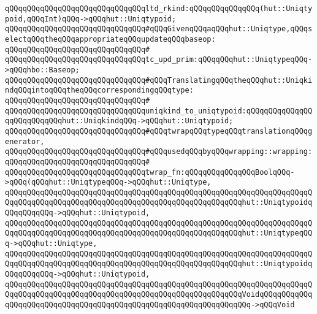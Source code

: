 \verb|qQQqqQQqqQQqqQQqqQQqqQQqqQQqqQQqltd_rkind:qQQqqQQqqQQqqQQq(hut::Uniqtypoid,qQQqInt)qQQq->qQQqhut::Uniqtypoid;|\newline
\newline
\verb|qQQqqQQqqQQqqQQqqQQqqQQqqQQqqQQq#qQQqGivenqQQqaqQQqhut::Uniqtype,qQQqselectqQQqtheqQQqappropriateqQQqupdateqQQqbaseop:|\newline
\verb|qQQqqQQqqQQqqQQqqQQqqQQqqQQqqQQq#|\newline
\verb|qQQqqQQqqQQqqQQqqQQqqQQqqQQqqQQqtc_upd_prim:qQQqqQQqhut::UniqtypeqQQq->qQQqhbo::Baseop;|\newline
\newline
\verb|qQQqqQQqqQQqqQQqqQQqqQQqqQQqqQQq#qQQqTranslatingqQQqtheqQQqhut::UniqkindqQQqintoqQQqtheqQQqcorrespondingqQQqtype:|\newline
\verb|qQQqqQQqqQQqqQQqqQQqqQQqqQQqqQQq#|\newline
\verb|qQQqqQQqqQQqqQQqqQQqqQQqqQQqqQQquniqkind_to_uniqtypoid:qQQqqQQqqQQqqQQqqQQqqQQqqQQqhut::UniqkindqQQq->qQQqhut::Uniqtypoid;|\newline
\newline
\verb|qQQqqQQqqQQqqQQqqQQqqQQqqQQqqQQq#qQQqtwrapqQQqtypeqQQqtranslationqQQqgenerator,|\newline
\verb|qQQqqQQqqQQqqQQqqQQqqQQqqQQqqQQq#qQQqusedqQQqbyqQQqwrapping::wrapping:|\newline
\verb|qQQqqQQqqQQqqQQqqQQqqQQqqQQqqQQq#|\newline
\verb|qQQqqQQqqQQqqQQqqQQqqQQqqQQqqQQqtwrap_fn:qQQqqQQqqQQqqQQqBoolqQQq->qQQq(qQQqhut::UniqtypeqQQq->qQQqhut::Uniqtype,|\newline
\verb|qQQqqQQqqQQqqQQqqQQqqQQqqQQqqQQqqQQqqQQqqQQqqQQqqQQqqQQqqQQqqQQqqQQqqQQqqQQqqQQqqQQqqQQqqQQqqQQqqQQqqQQqqQQqqQQqqQQqqQQqqQQqhut::UniqtypoidqQQqqQQqqQQq->qQQqhut::Uniqtypoid,|\newline
\verb|qQQqqQQqqQQqqQQqqQQqqQQqqQQqqQQqqQQqqQQqqQQqqQQqqQQqqQQqqQQqqQQqqQQqqQQqqQQqqQQqqQQqqQQqqQQqqQQqqQQqqQQqqQQqqQQqqQQqqQQqqQQqhut::UniqtypeqQQq->qQQqhut::Uniqtype,|\newline
\verb|qQQqqQQqqQQqqQQqqQQqqQQqqQQqqQQqqQQqqQQqqQQqqQQqqQQqqQQqqQQqqQQqqQQqqQQqqQQqqQQqqQQqqQQqqQQqqQQqqQQqqQQqqQQqqQQqqQQqqQQqqQQqhut::UniqtypoidqQQqqQQqqQQq->qQQqhut::Uniqtypoid,|\newline
\verb|qQQqqQQqqQQqqQQqqQQqqQQqqQQqqQQqqQQqqQQqqQQqqQQqqQQqqQQqqQQqqQQqqQQqqQQqqQQqqQQqqQQqqQQqqQQqqQQqqQQqqQQqqQQqqQQqqQQqqQQqqQQqVoidqQQqqQQqqQQqqQQqqQQqqQQqqQQqqQQqqQQqqQQqqQQqqQQqqQQqqQQqqQQqqQQqqQQq->qQQqVoid|\newline
